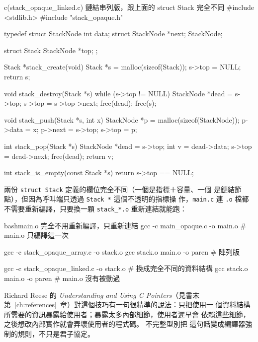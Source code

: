 \begin{example}{c}{(stack\_opaque\_linked.c) 鏈結串列版，跟上面的 struct Stack 完全不同}
#include <stdlib.h>
#include "stack_opaque.h"

typedef struct StackNode {
    int data;
    struct StackNode *next;
} StackNode;

struct Stack {
    StackNode *top;
};

Stack *stack_create(void) {
    Stack *s = malloc(sizeof(Stack));
    s->top = NULL;
    return s;
}

void stack_destroy(Stack *s) {
    while (s->top != NULL) {
        StackNode *dead = s->top;
        s->top = s->top->next;
        free(dead);
    }
    free(s);
}

void stack_push(Stack *s, int x) {
    StackNode *p = malloc(sizeof(StackNode));
    p->data = x;
    p->next = s->top;
    s->top = p;
}

int stack_pop(Stack *s) {
    StackNode *dead = s->top;
    int v = dead->data;
    s->top = dead->next;
    free(dead);
    return v;
}

int stack_is_empty(const Stack *s) { return s->top == NULL; }
\end{example}

兩份 \texttt{struct Stack} 定義的欄位完全不同（一個是指標＋容量、一個
是鏈結節點），但因為呼叫端只透過 \texttt{Stack *} 這個不透明的指標操
作，\texttt{main.c} 連 \texttt{.o} 檔都不需要重新編譯，只要換一顆
\texttt{stack\_*.o} 重新連結就能跑：

\begin{code}{bash}{main.o 完全不用重新編譯，只重新連結}
gcc -c main_opaque.c -o main.o          # main.o 只編譯這一次

gcc -c stack_opaque_array.c -o stack.o
gcc stack.o main.o -o paren             # 陣列版

gcc -c stack_opaque_linked.c -o stack.o # 換成完全不同的資料結構
gcc stack.o main.o -o paren             # main.o 沒有被動過
\end{code}

Richard Reese 的 \textit{Understanding and Using C Pointers}（見書末
第~\ref{ch:references}~章）對這個技巧有一句很精準的說法：只把使用一
個資料結構所需要的資訊暴露給使用者；暴露太多內部細節，使用者遲早會
依賴這些細節，之後想改內部實作就會弄壞使用者的程式碼。 不完整型別把
這句話變成編譯器強制的規則，不只是君子協定。


